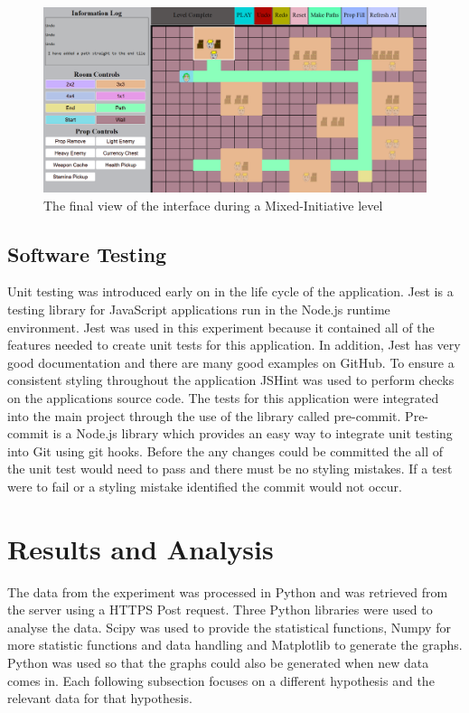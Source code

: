 \documentclass[journal]{IEEEtran}
\begin{document}
\begin{figure}[h]
	\includegraphics[width=1.0\linewidth]{LevelEditorFinal.PNG}
	\caption{The final view of the interface during a Mixed-Initiative level}
	\label{levelEditorFinal}
\end{figure} 

\subsection{Software Testing}
Unit testing was introduced early on in the life cycle of the application. Jest is a testing library for JavaScript applications run in the Node.js runtime environment. Jest was used in this experiment because it contained all of the features needed to create unit tests for this application. In addition, Jest has very good documentation and there are many good examples on GitHub.  To ensure a consistent styling throughout the application JSHint was used to perform checks on the applications source code. The tests for this application were integrated into the main project through the use of the library called pre-commit. Pre-commit is a  Node.js library which provides an easy way to integrate unit testing into Git using git hooks. Before the any changes could be committed the all of the unit test would need to pass and there must be no styling mistakes. If a test were to fail or a styling mistake identified the commit would not occur. 

\section{Results and Analysis}
The data from the experiment was processed in Python and was retrieved from the server using a HTTPS Post request. Three Python libraries were used to analyse the data. Scipy was used to provide the statistical functions, Numpy for more statistic functions and data handling and Matplotlib to generate the graphs. Python was used so that the graphs could also be generated when new data comes in. Each following subsection focuses on a different hypothesis and the relevant data for that hypothesis.
\end{document}
